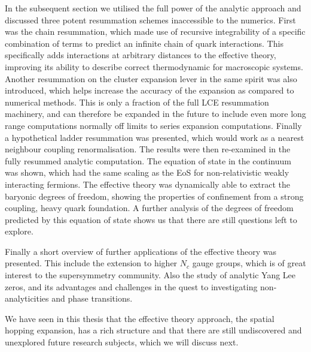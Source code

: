 In the subsequent section we utilised the full power of the analytic approach
and discussed three potent resummation schemes inaccessible to the numerics.
First was the chain resummation, which made use of recursive integrability of a
specific combination of terms to predict an infinite chain of quark
interactions. This specifically adds interactions at arbitrary distances to the
effective theory, improving its ability to describe correct thermodynamic for
macroscopic systems. Another resummation on the cluster expansion lever in the
same spirit was also introduced, which helps increase the accuracy of the
expansion as compared to numerical methods. This is only a fraction of the full
LCE resummation machinery, and can therefore be expanded in the future to
include even more long range computations normally off limits to series
expansion computations. Finally a hypothetical ladder resummation was presented,
which would work as a nearest neighbour coupling renormalisation. The results
were then re-examined in the fully resummed analytic computation. The equation
of state in the continuum was shown, which had the same scaling as the EoS for
non-relativistic weakly interacting fermions. The effective theory was
dynamically able to extract the baryonic degrees of freedom, showing the
properties of confinement from a strong coupling, heavy quark foundation. A
further analysis of the degrees of freedom predicted by this equation of state
shows us that there are still questions left to explore.

Finally a short overview of further applications of the effective theory was
presented. This include the extension to higher $N_c$ gauge groups, which is of
great interest to the supersymmetry community. Also the study of analytic Yang
Lee zeros, and its advantages and challenges in the quest to investigating
non-analyticities and phase transitions.

We have seen in this thesis that the effective theory approach, the spatial
hopping expansion, has a rich structure and that there are still undiscovered
and unexplored future research subjects, which we will discuss next.
